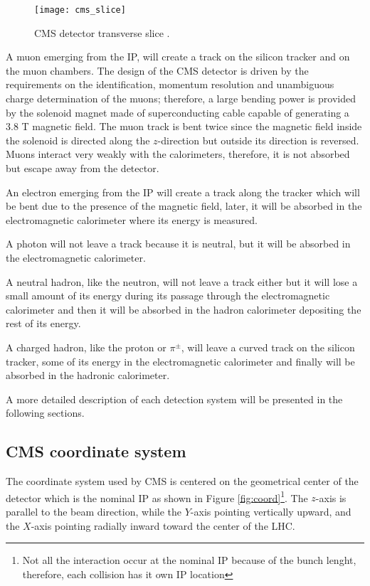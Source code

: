 \begin{figure}[h!]
  \centering
  \texttt{[image: cms\_slice]}
  \caption[CMS detector transverse slice]{CMS detector transverse slice \cite{cms_slice}.}
  \label{fig:cms_slice}
\end{figure}

A muon emerging from the IP, will create a track on the silicon tracker and on the muon chambers. The design of the CMS detector is driven by the requirements on the identification, momentum resolution and unambiguous charge determination of the muons; therefore, a large bending power is provided by the solenoid magnet made of superconducting cable capable of generating a 3.8 T magnetic field. The muon track is bent twice since the magnetic field inside the solenoid is directed along the $z$-direction but outside its direction is reversed. Muons interact very weakly with the calorimeters, therefore, it is not absorbed but escape away from the detector.  

An electron emerging from the IP will create a track along the tracker which will be bent due to the presence of the magnetic field, later, it will be absorbed in the electromagnetic calorimeter where its energy is measured.

A photon will not leave a track because it is neutral, but it will be absorbed in the electromagnetic calorimeter.

A neutral hadron, like the neutron, will not leave a track either but it will lose a small amount of its energy during its passage through the electromagnetic calorimeter and then it will be absorbed in the hadron calorimeter depositing the rest of its energy.

A charged hadron, like the proton or $\pi^\pm$, will leave a curved track on the silicon tracker, some of its energy in the electromagnetic calorimeter and finally will be absorbed in the hadronic calorimeter.

A more detailed description of each detection system will be presented in the following sections. 

\subsection{CMS coordinate system}

The coordinate system used by CMS is centered on the geometrical center of the detector which is the nominal IP as shown in Figure \ref{fig:coord}\footnote{Not all the \pp interaction occur at the nominal IP because of the bunch lenght, therefore, each \pp collision has it own IP location}. The $z$-axis is parallel to the beam direction, while the $Y$-axis pointing vertically upward, and the $X$-axis pointing radially inward toward the center of the LHC.


